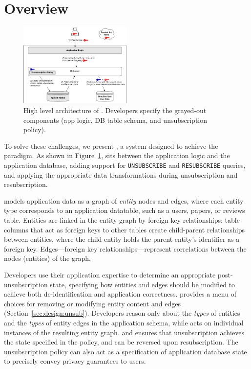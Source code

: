 \section{Overview}
\begin{figure}[t!]
    \centering
    \includegraphics[width=0.5\textwidth]{img/releaser_arch}

    \caption{High level architecture of \sys. Developers specify the grayed-out components (app logic, DB table schema, and
    unsubscription policy).}
    \label{fig:arch}
\end{figure}

To solve these challenges, we present \sys, a system designed to achieve the \name paradigm.
As shown in Figure~\ref{fig:arch}, \sys sits between the application logic and the application database, adding support for
\texttt{UNSUBSCRIBE} and \texttt{RESUBSCRIBE} queries, and applying the appropriate data transformations
during unsubscription and resubscription.

\sys models application data as a graph of \emph{entity} nodes and edges, where each entity type
corresponds to an application datatable, such as a users, papers, or reviews table.  Entities are
linked in the entity graph by foreign key relationships: table columns that act as foreign keys to
other tables create child-parent relationships between entities, where the child entity holds the
parent entity's identifier as a foreign key. 
Edges---foreign key relationships---represent correlations between the nodes (entities) of the
graph.

Developers use their application expertise to determine an appropriate post-unsubscription state,
specifying how entities and edges should be modified to achieve both de-identification and application correctness. 
\sys provides a menu of choices for removing or modifying entity content and edges (Section~\ref{sec:design:unsub}).
Developers reason only about the \emph{types} of entities and the \emph{types} of entity edges
in the application schema, while \sys acts on individual instances of the resulting entity graph. \sys and
ensures that unsubscription achieves the state specified in the policy, and can be reversed upon
resubscription. 
The unsubscription policy can also act as a specification of
application database state to precisely convey privacy guarantees to users.

